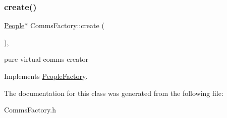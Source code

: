 \subsubsection{\texorpdfstring{create()}{create()}}
{\footnotesize\ttfamily \hyperlink{classPeople}{People}$\ast$ Comms\+Factory\+::create (\begin{DoxyParamCaption}{ }\end{DoxyParamCaption})\hspace{0.3cm}{\ttfamily [inline]}, {\ttfamily [virtual]}}

pure virtual comms creator 

Implements \hyperlink{classPeopleFactory}{People\+Factory}.



The documentation for this class was generated from the following file\+:\begin{DoxyCompactItemize}
\item 
Comms\+Factory.\+h\end{DoxyCompactItemize}
